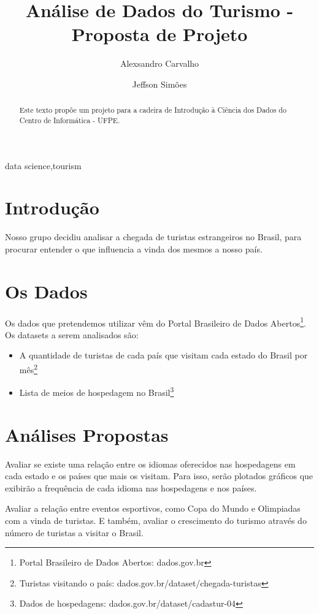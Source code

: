 \documentclass[review]{elsarticle}
\begin{document}
\begin{frontmatter}

\title{Análise de Dados do Turismo - Proposta de Projeto}

\author{Alexsandro Carvalho}

\author{Jeffson Simões}

\begin{abstract}
Este texto propõe um projeto para a cadeira de Introdução à Ciência dos Dados do Centro de Informática - UFPE.
\end{abstract}

\begin{keyword}
data science\sep tourism
\end{keyword}

\end{frontmatter}

\linenumbers

\section{Introdução}
Nosso grupo decidiu analisar a chegada de turistas estrangeiros no Brasil, para procurar entender o que influencia a vinda dos mesmos a nosso país.

\section{Os Dados}
Os dados que pretendemos utilizar vêm do Portal Brasileiro de Dados Abertos\footnote{Portal Brasileiro de Dados Abertos: dados.gov.br}. Os datasets a serem analisados são:
\begin{itemize}
\item A quantidade de turistas de cada país que visitam cada estado do Brasil por mês\footnote{Turistas visitando o país: dados.gov.br/dataset/chegada-turistas}
\item Lista de meios de hospedagem no Brasil\footnote{Dados de hospedagens: dados.gov.br/dataset/cadastur-04}
\end{itemize}

\section{Análises Propostas}
Avaliar se existe uma relação entre os idiomas oferecidos nas hospedagens em cada estado e os países que mais os visitam. Para isso, serão plotados gráficos que exibirão a frequência de cada idioma nas hospedagens e nos países.

Avaliar a relação entre eventos esportivos, como Copa do Mundo e Olimpiadas com a vinda de turistas. E também, avaliar o crescimento do turismo através do número de turistas a visitar o Brasil.
\end{document}
